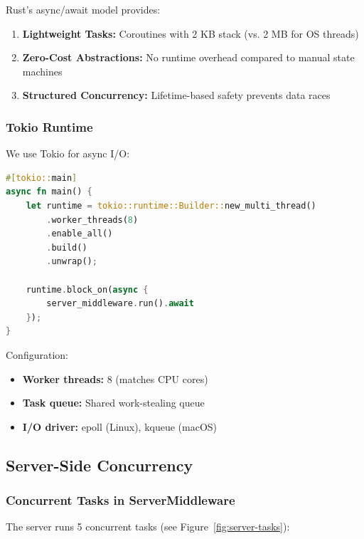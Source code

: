 \documentclass[12pt,a4paper]{article}
\begin{document}
Rust's async/await model provides:
\begin{enumerate}
    \item \textbf{Lightweight Tasks:} Coroutines with 2 KB stack (vs. 2 MB for OS threads)
    \item \textbf{Zero-Cost Abstractions:} No runtime overhead compared to manual state machines
    \item \textbf{Structured Concurrency:} Lifetime-based safety prevents data races
\end{enumerate}

\subsubsection{Tokio Runtime}

We use Tokio \cite{tokio} for async I/O:

\begin{lstlisting}[language=Rust,caption={Tokio Runtime Initialization},label=lst:tokio-init]
#[tokio::main]
async fn main() {
    let runtime = tokio::runtime::Builder::new_multi_thread()
        .worker_threads(8)
        .enable_all()
        .build()
        .unwrap();

    runtime.block_on(async {
        server_middleware.run().await
    });
}
\end{lstlisting}

Configuration:
\begin{itemize}
    \item \textbf{Worker threads:} 8 (matches CPU cores)
    \item \textbf{Task queue:} Shared work-stealing queue
    \item \textbf{I/O driver:} epoll (Linux), kqueue (macOS)
\end{itemize}

\subsection{Server-Side Concurrency}

\subsubsection{Concurrent Tasks in ServerMiddleware}

The server runs 5 concurrent tasks (see Figure~\ref{fig:server-tasks}):
\end{document}
